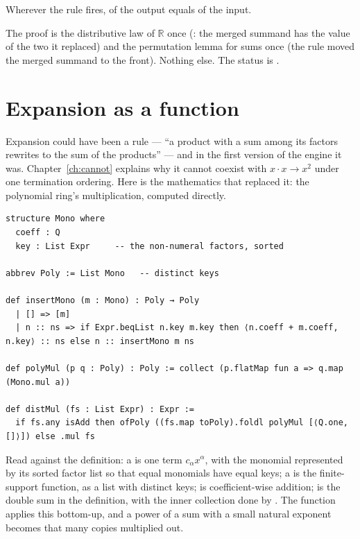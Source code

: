 \begin{thmbox}
  Wherever the rule fires,  of the output equals  of the input.
\end{thmbox}

The proof is the distributive law of $\mathbb{R}$ once (: the merged
summand has the value of the two it replaced) and the permutation lemma for sums once (the
rule moved the merged summand to the front). Nothing else. The status is .

\section{Expansion as a function}

Expansion could have been a rule --- ``a product with a sum among its factors rewrites to the
sum of the products'' --- and in the first version of the engine it was. Chapter~\ref{ch:cannot}
explains why it cannot coexist with $x \cdot x \to x^2$ under one termination ordering. Here is
the mathematics that replaced it: the polynomial ring's multiplication, computed directly.

\begin{verbatim}
structure Mono where
  coeff : Q
  key : List Expr     -- the non-numeral factors, sorted

abbrev Poly := List Mono   -- distinct keys

def insertMono (m : Mono) : Poly → Poly
  | [] => [m]
  | n :: ns => if Expr.beqList n.key m.key then ⟨n.coeff + m.coeff, n.key⟩ :: ns else n :: insertMono m ns

def polyMul (p q : Poly) : Poly := collect (p.flatMap fun a => q.map (Mono.mul a))

def distMul (fs : List Expr) : Expr :=
  if fs.any isAdd then ofPoly ((fs.map toPoly).foldl polyMul [⟨Q.one, []⟩]) else .mul fs
\end{verbatim}

Read against the definition: a  is one term $c_\alpha x^\alpha$, with the monomial
represented by its sorted factor list so that equal monomials have equal keys; a  is
the finite-support function, as a list with distinct keys;  is coefficient-wise
addition;  is the double sum in the definition, with the inner collection done by
. The function  applies this bottom-up, and a power of a sum with a small
natural exponent becomes that many copies multiplied out.

